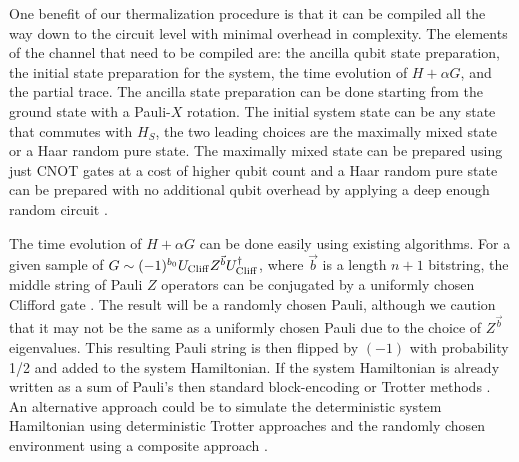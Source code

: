 \documentclass[
 amsmath,amssymb,
 aps,
onecolumn, 
nofootinbib]{revtex4-2}
\begin{document}
One benefit of our thermalization procedure is that it can be compiled all the way down to the circuit level with minimal overhead in complexity. The elements of the channel that need to be compiled are: the ancilla qubit state preparation, the initial state preparation for the system, the time evolution of $H + \alpha G$, and the partial trace. The ancilla state preparation can be done starting from the ground state with a Pauli-$X$ rotation. The initial system state can be any state that commutes with $H_S$, the two leading choices are the maximally mixed state or a Haar random pure state. The maximally mixed state can be prepared using just CNOT gates at a cost of higher qubit count and a Haar random pure state can be prepared with no additional qubit overhead by applying a deep enough random circuit \cite{choi2023preparing}. 



The time evolution of $H + \alpha G$ can be done easily using existing algorithms. For a given sample of $G \sim (-1)^{b_0} U_{\rm Cliff} Z^{\vec{b}} U_{\rm Cliff}^\dagger$, where $\vec{b}$ is a length $n + 1$ bitstring, the middle string of Pauli $Z$ operators can be conjugated by a uniformly chosen Clifford gate \cite{koenig2014efficiently}. The result will be a randomly chosen Pauli, although we caution that it may not be the same as a uniformly chosen Pauli due to the choice of $Z^{\vec{b}}$ eigenvalues. This resulting Pauli string is then flipped by $(-1)$ with probability 1/2 and added to the system Hamiltonian. If the system Hamiltonian is already written as a sum of Pauli's then standard block-encoding \cite{low2019hamiltonian} or Trotter methods \cite{lloyd1996universal, childs2021theory}. An alternative approach could be to simulate the deterministic system Hamiltonian using deterministic Trotter approaches and the randomly chosen environment using a composite approach \cite{hagan2023composite}.
\end{document}
